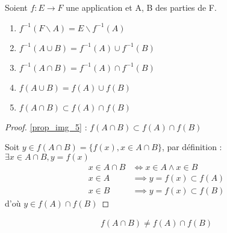     \begin{graybox}
    	\begin{proposition}
    		Soient $f:E \to F$ une application et A, B des parties de F.
    		\begin{enumerate}
    			\item \label{prop_img_1} $f^{-1}(F \backslash A) = E \backslash f^{-1}(A)$
    			\item \label{prop_img_2} $f^{-1}(A \cup B) = f^{-1}(A) \cup f^{-1}(B)$
    			\item \label{prop_img_3} $f^{-1}(A \cap B) = f^{-1}(A) \cap f^{-1}(B)$
    			\item \label{prop_img_4} $f(A \cup B) = f(A) \cup f(B)$
    			\item \label{prop_img_5} $f(A \cap B) \subset f(A) \cap f(B)$
    		\end{enumerate}
    	\end{proposition}
    \end{graybox}


\begin{proof}
	\ref{prop_img_5} : $f(A \cap B) \subset f(A) \cap f(B)$ \\
	\par \noindent Soit $y \in f(A \cap B) = \{f(x), x \in A \cap B\}$, par définition : $\exists x \in A \cap B, y = f(x)$
	\begin{align*}
		x \in A \cap B &\iff x \in A \wedge x \in B \\
		x \in A &\implies y = f(x) \subset f(A) \\
		x \in B &\implies y = f(x) \subset f(B) 
	\end{align*}
	d'où $y \in f(A) \cap f(B)$
\end{proof} 


\begin{remarque}
	\begin{align*}
		f(A \cap B) \neq f(A) \cap f(B)
	\end{align*}
\end{remarque}

